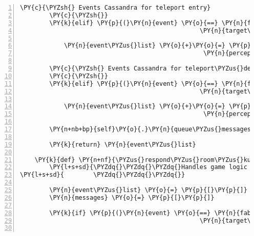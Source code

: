\begin{Verbatim}[commandchars=\\\{\},numbers=left,firstnumber=1,stepnumber=1]
        \PY{c}{\PYZsh{} Events Cassandra for teleport entry}
        \PY{c}{\PYZsh{}}
        \PY{k}{elif} \PY{p}{(}\PY{n}{event} \PY{o}{==} \PY{n}{fabula}\PY{o}{.}\PY{n}{TriesToLookAtEvent}\PY{p}{(}\PY{n}{identifier}\PY{o}{=}\PY{n}{ID\PYZus{}CASSANDRA}\PY{p}{,}
                                                 \PY{n}{target\PYZus{}identifier}\PY{o}{=}\PY{l+s}{\PYZsq{}}\PY{l+s}{teleport\PYZus{}entry}\PY{l+s}{\PYZsq{}}\PY{p}{)}\PY{p}{)}\PY{p}{:}

            \PY{n}{event\PYZus{}list} \PY{o}{+}\PY{o}{=} \PY{p}{[}\PY{n}{fabula}\PY{o}{.}\PY{n}{PerceptionEvent}\PY{p}{(}\PY{n}{identifier}\PY{o}{=}\PY{n}{ID\PYZus{}CASSANDRA}\PY{p}{,}
                                                  \PY{n}{perception}\PY{o}{=}\PY{l+s}{\PYZsq{}}\PY{l+s}{Hier geht es weiter Richtung Zauberwald.}\PY{l+s}{\PYZsq{}}\PY{p}{)}\PY{p}{]}

        \PY{c}{\PYZsh{} Events Cassandra for teleport\PYZus{}default}
        \PY{c}{\PYZsh{}}
        \PY{k}{elif} \PY{p}{(}\PY{n}{event} \PY{o}{==} \PY{n}{fabula}\PY{o}{.}\PY{n}{TriesToLookAtEvent}\PY{p}{(}\PY{n}{identifier}\PY{o}{=}\PY{n}{ID\PYZus{}CASSANDRA}\PY{p}{,}
                                                 \PY{n}{target\PYZus{}identifier}\PY{o}{=}\PY{l+s}{\PYZsq{}}\PY{l+s}{teleport\PYZus{}default}\PY{l+s}{\PYZsq{}}\PY{p}{)}\PY{p}{)}\PY{p}{:}

            \PY{n}{event\PYZus{}list} \PY{o}{+}\PY{o}{=} \PY{p}{[}\PY{n}{fabula}\PY{o}{.}\PY{n}{PerceptionEvent}\PY{p}{(}\PY{n}{identifier}\PY{o}{=}\PY{n}{ID\PYZus{}CASSANDRA}\PY{p}{,}
                                                  \PY{n}{perception}\PY{o}{=}\PY{l+s}{\PYZsq{}}\PY{l+s}{Hier geht es zurück auf die andere Seite des Flusses.}\PY{l+s}{\PYZsq{}}\PY{p}{)}\PY{p}{]}

        \PY{n+nb+bp}{self}\PY{o}{.}\PY{n}{queue\PYZus{}messages}\PY{p}{(}\PY{o}{*}\PY{n}{messages}\PY{p}{)}

        \PY{k}{return} \PY{n}{event\PYZus{}list}

    \PY{k}{def} \PY{n+nf}{\PYZus{}respond\PYZus{}room\PYZus{}kuni}\PY{p}{(}\PY{n+nb+bp}{self}\PY{p}{,} \PY{n}{event}\PY{p}{,} \PY{n}{room}\PY{p}{)}\PY{p}{:}
        \PY{l+s+sd}{\PYZdq{}\PYZdq{}\PYZdq{}Handles game logic for room kuni.}
\PY{l+s+sd}{        \PYZdq{}\PYZdq{}\PYZdq{}}

        \PY{n}{event\PYZus{}list} \PY{o}{=} \PY{p}{[}\PY{p}{]}
        \PY{n}{messages} \PY{o}{=} \PY{p}{[}\PY{p}{]}

        \PY{k}{if} \PY{p}{(}\PY{n}{event} \PY{o}{==} \PY{n}{fabula}\PY{o}{.}\PY{n}{TriesToLookAtEvent}\PY{p}{(}\PY{n}{identifier}\PY{o}{=}\PY{n}{ID\PYZus{}KUNI}\PY{p}{,}
                                                 \PY{n}{target\PYZus{}identifier}\PY{o}{=}\PY{l+s}{\PYZsq{}}\PY{l+s}{elf}\PY{l+s}{\PYZsq{}}\PY{p}{)}\PY{p}{)}\PY{p}{:}


\end{Verbatim}
